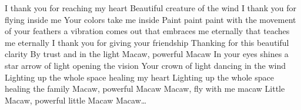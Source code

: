   \endverse
  \begin{translation}[EN]
    I thank you for reaching my heart
    Beautiful creature of the wind
    I thank you for flying inside me
    Your colors take me inside
    \nextverse
    Paint paint paint with the movement
    of your feathers a vibration comes out
    that embraces me eternally
    that teaches me eternally
    \nextverse
    I thank you for giving your friendship
    Thanking for this beautiful clarity
    By trust and in the light
    \nextverse
    Macaw, powerful Macaw
    \nextverse
    In your eyes shines a star arrow of light opening the vision
    Your crown of light dancing in the wind
    Lighting up the whole space healing my heart
    Lighting up the whole space healing the family
    \nextverse
    Macaw, powerful Macaw
    \nextverse
    Macaw, fly with me macaw
    Little Macaw, powerful little Macaw
    Macaw\ldots

\end{translation}\]\]\]\]\]\]\]\]\]\]\]\]\]\]\]\]\]\]\]\]\]\]\]\]\]\]\]\]\]\]\]\]\]\]\]\]\]\]\]\]\]\]\]\]\]\]\]\]\]\]\]\]\]\]\]\]\]\]\]\]\]\]\]\]\]\]\]\]\]\]\]\]\]\]\]\]\]\]\]\]\]\]\]\]\]\]\]\]\]\]\]\]\]\]\]\]\]\]\]\]\]\]\]\]\]\]\]\]\]\]\]\]\]\]\]\]\]\]\]\]\]\]\]\]\]\]\]\]\]\]\]\]\]\]\]\]\]\]\]\]\]\]\]\]\]\]\]\]\]\]\]\]\]\]\]\]\]\]\]\]\]\]\]\]\]\]\]\]\]\]\]\]\]\]\]\]\]\]\]\]\]\]\]\]\]\]\]\]\]\]\]\]\]\]\]\]\]\]\]\]\]\]\]\]\]\]\]\]\]\]\]\]\]\]\]\]\]\]\]\]\]\]\]\]\]\]\]\]\]\]\]\]\]\]\]\]\]\]\]\]\]\]\]\]\]\]\]\]\]\]\]\]\]\]\]\]\]\]\]\]\]\]\]\]\]\]\]\]\]\]\]\]\]\]\]\]\]\]\]\]\]\]\]\]\]\]\]\]\]\]\]\]\]\]\]\]\]\]\]\]\]\]\]\]\]\]\]\]\]\]\]\]\]\]\]\]\]\]\]\]\]\]\]\]\]\]\]\]\]\]\]\]\]\]\]\]\]\]\]\]\]\]\]\]\]\]\]\]\]\]\]\]\]\]\]\]\]\]\]\]\]\]\]\]\]\]\]\]\]\]\]\]\]\]\]\]\]\]\]\]\]\]\]\]\]\]\]\]\]\]\]\]\]\]\]\]\]\]\]\]\]\]\]\]\]\]\]\]\]\]\]\]\]\]\]\]\]\]\]\]\]\]\]\]\]\]\]\]\]\]\]\]\]\]\]\]\]\]\]\]\]\]\]\]\]\]\]\]\]\]\]\]\]\]\]\]\]\]\]\]\]\]\]\]\]\]\]\]\]\]\]\]\]\]\]\]\]\]\]\]\]\]\]\]\]\]\]\]\]\]\]\]\]\]\]\]\]\]\]\]\]\]\]\]\]\]\]\]\]\]\]\]\]\]\]\]\]\]\]\]\]\]\]\]\]\]\]\]\]\]\]\]\]\]\]\]\]\]\]\]\]\]\]\]\]\]\]\]\]\]\]\]\]\]\]\]\]\]\]\]\]\]\]\]\]\]\]\]\]\]\]\]\]\]\]\]\]\]\]\]\]\]\]\]\]\]\]\]\]\]\]\]\]\]\]\]\]\]\]\]\]\]\]\]\]\]\]\]\]\]\]\]\]\]\]\]\]\]\]\]\]\]\]\]\]\]\]\]\]\]\]\]\]\]\]\]\]\]\]\]\]\]\]\]\]\]\]\]\]\]\]\]\]\]\]\]\]\]\]\]\]\]\]\]\]\]\]\]\]\]\]\]\]\]\]\]\]\]\]\]\]\]\]\]\]\]\]\]\]\]\]\]\]\]\]\]\]\]\]\]\]\]\]\]\]\]\]\]\]\]\]\]\]\]\]\]\]\]\]\]\]\]\]\]\]\]\]\]\]\]\]\]\]\]\]\]\]\]\]\]\]\]\]\]\]\]\]\]\]\]\]\]\]\]\]\]\]\]\]\]\]\]\]\]\]\]\]\]\]\]\]\]\]\]\]\]\]\]\]\]\]\]\]\]\]\]\]\]\]\]\]\]\]\]\]\]\]\]\]\]\]\]\]\]\]\]\]\]\]\]\]\]\]\]\]\]\]\]\]\]\]\]\]\]\]\]\]\]\]\]\]\]\]\]\]\]\]\]\]\]\]\]\]\]\]\]\]\]\]\]\]\]\]\]\]\]\]\]\]\]\]\]\]\]\]\]\]\]\]\]\]\]\]\]\]\]\]\]\]\]\]\]\]\]\]\]\]\]\]\]\]\]\]\]\]\]\]\]\]\]\]\]\]\]\]\]\]\]\]\]\]\]\]\]\]\]\]\]\]\]\]\]\]\]\]\]\]\]\]\]\]\]\]\]\]\]\]\]\]\]\]\]\]\]\]\]\]\]\]\]\]\]\]\]\]\]\]\]\]\]\]\]\]\]\]\]\]\]\]\]\]\]\]\]\]\]\]\]\]\]\]\]\]\]\]\]\]\]\]\]\]\]\]\]\]\]\]\]\]\]\]\]\]\]\]\]\]\]\]\]\]\]\]\]\]\]\]\]\]\]\]\]\]\]\]\]\]\]\]\]\]\]\]\]\]\]\]\]\]\]\]\]\]\]\]\]\]\]\]\]\]\]\]\]\]\]\]\]\]\]\]\]\]\]\]\]\]\]\]\]\]\]\]\]\]\]\]\]\]\]\]\]\]\]\]\]\]\]\]\]\]\]\]\]\]\]\]\]\]\]\]\]\]\]\]\]\]\]\]\]\]\]\]\]\]\]\]\]\]\]\]\]\]\]\]\]\]\]\]\]\]\]\]\]\]\]\]\]\]\]\]\]\]\]\]\]\]\]\]\]\]\]\]\]\]\]\]\]\]\]\]\]\]\]\]\]\]\]\]\]\]\]\]\]\]\]\]\]\]\]\]\]\]\]\]\]\]\]\]\]\]\]\]\]\]\]\]\]\]\]\]\]\]\]\]\]\]\]\]\]\]\]\]\]\]\]\]\]\]\]\]\]\]\]\]\]\]\]\]
